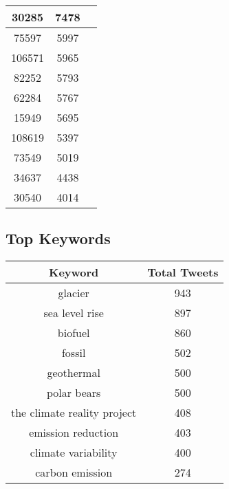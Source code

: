 \documentclass{article}\usepackage[T1]{fontenc}
\begin{document}
\begin{tabular}{|c|c|c|}
 \hline
30285 & 7478\\ 
 \hline
75597 & 5997\\ 
 \hline
106571 & 5965\\ 
 \hline
82252 & 5793\\ 
 \hline
62284 & 5767\\ 
 \hline
15949 & 5695\\ 
 \hline
108619 & 5397\\ 
 \hline
73549 & 5019\\ 
 \hline
34637 & 4438\\ 
 \hline
30540 & 4014\\ 
 \hline
\end{tabular}\subsection*{Top Keywords}\begin{tabular}{|c|c|}         \hline         Keyword & Total Tweets \\ 
 \hline
glacier & 943\\ 
 \hline
sea level rise & 897\\ 
 \hline
biofuel & 860\\ 
 \hline
fossil & 502\\ 
 \hline
geothermal & 500\\ 
 \hline
polar bears & 500\\ 
 \hline
the climate reality project & 408\\ 
 \hline
emission reduction & 403\\ 
 \hline
climate variability & 400\\ 
 \hline
carbon emission & 274\\ 
 \hline
\end{tabular}
\end{document}
